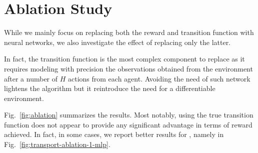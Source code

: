 \section{Ablation Study}\label{sect:ablation}
While we mainly focus on replacing both the reward and transition function with neural networks, we also investigate the effect of replacing only the latter. 

In fact, the transition function is the most complex component to replace as it requires modeling with precision the observations obtained from the environment after a number of $H$ actions from each agent. Avoiding the need of such network lightens the algorithm but it reintroduce the need for a differentiable environment.

Fig.~\ref{fig:ablation} summarizes the results. Most notably, using the true transition function does not appear to provide any significant advantage in terms of reward achieved. In fact, in some cases, we report better results for \fname{}, namely in Fig.~\ref{fig:transport-ablation-1-mlp}. 

